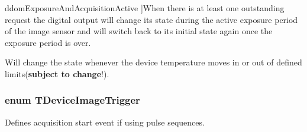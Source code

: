 \begin{Desc}
\begin{description}
{\hypertarget{group___device_specific_interface_ggad65061e17a93ca4a79e5b75d8ca78a27a31750f833a4e53a5121c32956b5e4736}{ddom\+Exposure\+And\+Acquisition\+Active}\label{group___device_specific_interface_ggad65061e17a93ca4a79e5b75d8ca78a27a31750f833a4e53a5121c32956b5e4736}
}]When there is at least one outstanding request the digital output will change its state during the active exposure period of the image sensor and will switch back to its initial state again once the exposure period is over. \item[{\em 
\hypertarget{group___device_specific_interface_ggad65061e17a93ca4a79e5b75d8ca78a27a595294f6addc6d643b90f1a51841bbf0}{ddom\+Temperature\+Out\+Of\+Range}\label{group___device_specific_interface_ggad65061e17a93ca4a79e5b75d8ca78a27a595294f6addc6d643b90f1a51841bbf0}
}]Will change the state whenever the device temperature moves in or out of defined limits({\bfseries subject to change}!). \end{description}
\end{Desc}
\hypertarget{group___device_specific_interface_ga84cf0914a0520d38dac38d96d5bc9754}{
\subsubsection[{T\+Device\+Image\+Trigger}]{\setlength{\rightskip}{0pt plus 5cm}enum {\bf T\+Device\+Image\+Trigger}}}\label{group___device_specific_interface_ga84cf0914a0520d38dac38d96d5bc9754}


Defines acquisition start event if using pulse sequences. 

